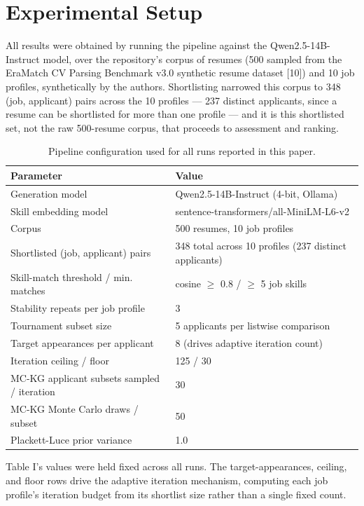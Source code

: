 \documentclass[journal]{IEEEtran}
\begin{document}
\section{Experimental Setup}
All results were obtained by running the pipeline against the Qwen2.5-14B-Instruct model, over the repository's corpus of resumes (500 sampled from the EraMatch CV Parsing Benchmark v3.0 synthetic resume dataset [10]) and 10 job profiles, synthetically by the authors. Shortlisting narrowed this corpus to 348 (job, applicant) pairs across the 10 profiles --- 237 distinct applicants, since a resume can be shortlisted for more than one profile --- and it is this shortlisted set, not the raw 500-resume corpus, that proceeds to assessment and ranking.

\begin{table}[!ht]
\caption{Pipeline configuration used for all runs reported in this paper.}
\label{tab_config}
\centering
\footnotesize
\begin{tabular}{p{1.4in}p{1.7in}}
\hline
Parameter & Value\\
\hline
Generation model & Qwen2.5-14B-Instruct (4-bit, Ollama)\\
Skill embedding model & sentence-transformers/all-MiniLM-L6-v2\\
Corpus & 500 resumes, 10 job profiles\\
Shortlisted (job, applicant) pairs & 348 total across 10 profiles (237 distinct applicants)\\
Skill-match threshold / min. matches & cosine $\geq$ 0.8 / $\geq$ 5 job skills\\
Stability repeats per job profile & 3\\
Tournament subset size & 5 applicants per listwise comparison\\
Target appearances per applicant & 8 (drives adaptive iteration count)\\
Iteration ceiling / floor & 125 / 30\\
MC-KG applicant subsets sampled / iteration & 30\\
MC-KG Monte Carlo draws / subset & 50\\
Plackett-Luce prior variance & 1.0\\
\hline
\end{tabular}
\end{table}

Table I's values were held fixed across all runs. The target-appearances, ceiling, and floor rows drive the adaptive iteration mechanism, computing each job profile's iteration budget from its shortlist size rather than a single fixed count.
\end{document}
